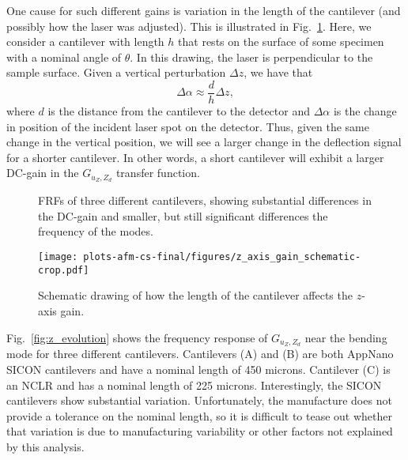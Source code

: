 One cause for such different gains is variation in the length of the cantilever (and possibly how the laser was adjusted). This is illustrated in Fig.~\ref{fig:z_axis_gain}. Here, we consider a cantilever with length $h$ that rests on the surface of some specimen with a nominal angle of $\theta$. In this drawing, the laser is perpendicular to the sample surface. Given a vertical perturbation $\Delta z$, we have that
\begin{equation}
  \Delta \alpha \approx \frac{d}{h} \Delta z,
\end{equation}
where $d$ is the distance from the cantilever to the detector and $\Delta \alpha$ is the change in position of the incident laser spot on the detector. Thus, given the same change in the vertical position, we will see a larger change in the deflection signal for a shorter cantilever. In other words, a short cantilever will exhibit a larger DC-gain in the $G_{u_Z,Z_d}$ transfer function. 
\begin{figure}
    \begin{minipage}[t]{.46\textwidth}
    
    \caption{FRFs of three different cantilevers, showing substantial differences in the DC-gain and smaller, but still significant differences the frequency of the modes.}
  \label{fig:z_evolution}
\end{minipage}
\hfill
  \begin{minipage}[t]{.46\textwidth}
  \texttt{[image: plots-afm-cs-final/figures/z\_axis\_gain\_schematic-crop.pdf]}
    \caption{Schematic drawing of how the length of the cantilever affects the $z$-axis gain.}
    \label{fig:z_axis_gain}
  \end{minipage}
\end{figure}

Fig.~\ref{fig:z_evolution} shows the frequency response of $G_{u_Z,Z_d}$ near the bending mode for three different cantilevers. Cantilevers (A) and (B) are both AppNano SICON cantilevers and have a nominal length of 450 microns. Cantilever (C) is an NCLR and has a nominal length of 225 microns. Interestingly, the SICON cantilevers show substantial variation. Unfortunately, the manufacture does not provide a tolerance on the nominal length, so it is difficult to tease out whether that variation is due to manufacturing variability or other factors not explained by this analysis.

